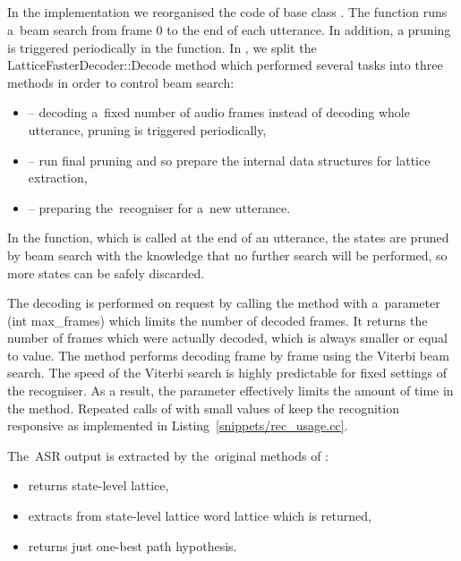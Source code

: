 \subsection{}
\label{sub:dec}
In the  implementation we reorganised the code of base class .
The  function runs a~beam search from frame 0 to the end of each utterance.
In addition, a pruning is triggered periodically in the function.
In ,  we split the LatticeFasterDecoder::Decode method which performed several tasks into three methods in order to control beam search:
\begin{itemize}
    \item {} -- decoding a~fixed number of audio frames instead of decoding whole utterance, pruning is triggered periodically,
    \item {} -- run final pruning and so prepare the internal data structures for lattice extraction,
    \item {} -- preparing the~recogniser for a~new utterance.
\end{itemize}

In the  function, which is called at the end of an utterance, the states are pruned by beam search with the knowledge that no further search will be performed, so more states can be safely discarded.

The decoding is performed on request by calling the  method with a~parameter (int max\_frames) which limits the number of decoded frames.
It returns the number of frames which were actually decoded, which is always smaller or equal to  value.
The  method performs decoding frame by frame using the Viterbi beam search.
The speed of the Viterbi search is highly predictable for fixed settings of the recogniser. 
As a result, the  parameter effectively limits the amount of time in the  method.
Repeated calls of  with small values of  keep the recognition responsive as implemented in Listing~\ref{snippets/rec_usage.cc}. 

The~\ac{ASR} output is extracted by the~original methods of :
\begin{itemize}
    \item {} returns state-level lattice,
    \item {} extracts from state-level lattice word lattice which is returned,
    \item {} returns just one-best path hypothesis.
\end{itemize}

